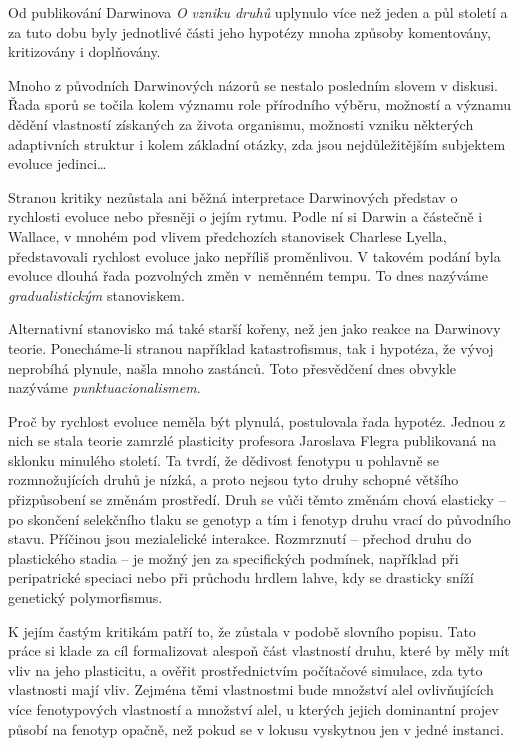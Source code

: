 Od publikování Darwinova \textit{O vzniku druhů} uplynulo více než jeden a půl století a za tuto dobu byly jednotlivé části
jeho hypotézy mnoha způsoby komentovány, kritizovány i doplňovány.

Mnoho z původních Darwinových názorů se nestalo posledním slovem v diskusi. Řada sporů se točila kolem významu role
přírodního výběru, možností a významu dědění vlastností získaných za života organismu, možnosti vzniku některých
adaptivních struktur i kolem základní otázky, zda jsou nejdůležitějším subjektem evoluce jedinci\ldots

Stranou kritiky nezůstala ani běžná interpretace Darwinových představ o rychlosti evoluce nebo přesněji o jejím rytmu.
Podle ní si Darwin a částečně i Wallace, v mnohém pod vlivem předchozích stanovisek Charlese Lyella,
představovali rychlost evoluce jako nepříliš proměnlivou. V takovém podání byla evoluce dlouhá řada pozvolných změn
v~neměnném tempu. To dnes nazýváme \textit{gradualistickým} stanoviskem.

Alternativní stanovisko má také starší kořeny, než jen jako reakce na Darwinovy teorie. Ponecháme-li stranou například
katastrofismus, tak i hypotéza, že vývoj neprobíhá plynule, našla mnoho zastánců. Toto přesvědčení dnes
obvykle nazýváme \textit{punktuacionalismem}.

Proč by rychlost evoluce neměla být plynulá, postulovala řada hypotéz. Jednou z nich se stala teorie zamrzlé plasticity
profesora Jaroslava Flegra publikovaná na sklonku minulého století. Ta tvrdí, že dědivost fenotypu u pohlavně se
rozmnožujících druhů je nízká, a proto nejsou tyto druhy schopné většího přizpůsobení se změnám prostředí. Druh se vůči
těmto změnám chová elasticky -- po skončení selekčního tlaku se genotyp a tím i fenotyp druhu vrací do původního stavu.
Příčinou jsou mezialelické interakce. Rozmrznutí -- přechod druhu do plastického stadia -- je možný jen za specifických
podmínek, například při peripatrické speciaci nebo při průchodu hrdlem lahve, kdy se drasticky sníží genetický
polymorfismus.

K jejím častým kritikám patří to, že zůstala v podobě slovního popisu. Tato práce si klade za cíl formalizovat alespoň
část vlastností druhu, které by měly mít vliv na jeho plasticitu, a ověřit prostřednictvím počítačové simulace, zda
tyto vlastnosti mají vliv. Zejména těmi vlastnostmi bude množství alel ovlivňujících více fenotypových vlastností a
množství alel, u kterých jejich dominantní projev působí na fenotyp opačně, než pokud se v lokusu vyskytnou jen v jedné
instanci.
